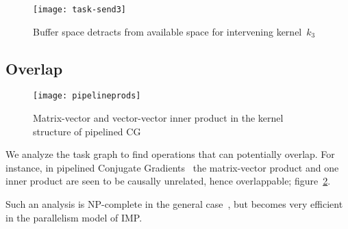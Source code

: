 \begin{figure}[ht]
\texttt{[image: task-send3]}
  \caption{Buffer space detracts from available space for intervening kernel~$k_3$}
  \label{fig:tasksend3}
\end{figure}

\subsection{Overlap}

\begin{figure}[ht]
  \texttt{[image: pipelineprods]}
  \caption{Matrix-vector and vector-vector inner product in the kernel
    structure of pipelined CG}
  \label{fig:pipelineprods}
\end{figure}

We analyze the task graph to find operations that can potentially
overlap. For instance, in pipelined Conjugate Gradients~\cite{IMP-17}
the matrix-vector product and one inner product are seen to be
causally unrelated, hence overlappable; figure~\ref{fig:pipelineprods}.

Such an analysis is NP-complete in the general
case~\cite{Taylor:syncNP}, but becomes very efficient in the
parallelism model of IMP.
